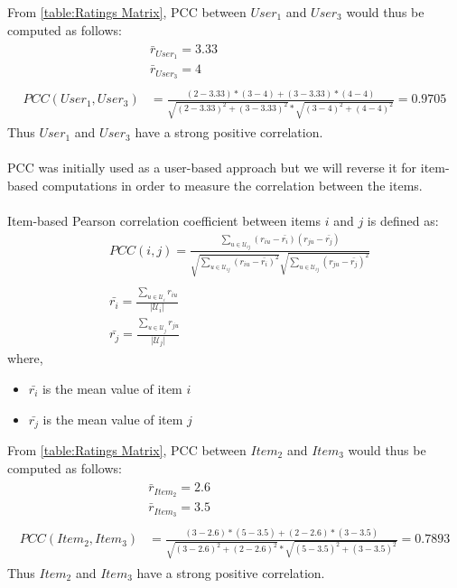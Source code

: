 From \autoref{table:Ratings Matrix}, PCC
between $User_1$ and $User_3$ would thus be computed as follows:
\begin{align*}
	\begin{split}
		&\bar{r}_{User_1} = 3.33\\
		&\bar{r}_{User_3} = 4\\\\
		PCC(User_1,User_3) &= \frac{(2 - 3.33) * (3 - 4) + (3 - 3.33) * (4 - 4)}
								  {\sqrt{(2 - 3.33)^2 + (3 - 3.33)^2} *
								   \sqrt{(3 - 4)^2 + (4 - 4)^2}} = 0.9705
	\end{split}
\end{align*}
Thus $User_1$ and $User_3$ have a strong positive correlation.\\\\
PCC was initially used as a user-based approach\citep{shardanand1995social} but we will
reverse it for item-based computations in order to measure the correlation between the items.\\\\
Item-based Pearson correlation coefficient between items $i$ and $j$ is defined as:
\begin{equation}
	\begin{split}
	&PCC(i,j) = \frac{\sum_{u \in \mathcal{U}_{ij}}(r_{iu}-\bar{r_{i}})(r_{ju}-\bar{r_{j}})}
					 {\sqrt{\sum_{u \in \mathcal{U}_{ij}}(r_{iu}-\bar{r_{i}})^2}
					  \sqrt{\sum_{u \in \mathcal{U}_{ij}}(r_{ju}-\bar{r_{j}})^2}} \\\\
	&\bar{r_{i}} = \frac{\sum_{u \in \mathcal{U}_i}r_{iu}}
						{\mathopen|\mathcal{U}_i\mathclose|}\\
	&\bar{r_{j}} = \frac{\sum_{u \in \mathcal{U}_j}r_{ju}}
						{\mathopen|\mathcal{U}_j\mathclose|}
\end{split}
\end{equation}
where,
\begin{itemize}
	\item[] $\bar{r_i}$ is the mean value of item $i$
	\item[] $\bar{r_j}$ is the mean value of item $j$
\end{itemize}
From \autoref{table:Ratings Matrix}, PCC
between $Item_2$ and $Item_3$ would thus be computed as follows:
\begin{align*}
	\begin{split}
		&\bar{r}_{Item_2} = 2.6\\
		&\bar{r}_{Item_3} = 3.5\\\\
		PCC(Item_2,Item_3) &= \frac{(3 - 2.6) * (5 - 3.5) + (2 - 2.6) * (3 - 3.5)}
								  {\sqrt{(3 - 2.6)^2 + (2 - 2.6)^2} *
								   \sqrt{(5 - 3.5)^2 + (3 - 3.5)^2}} = 0.7893
	\end{split}
\end{align*}
Thus $Item_2$ and $Item_3$ have a strong positive correlation.
